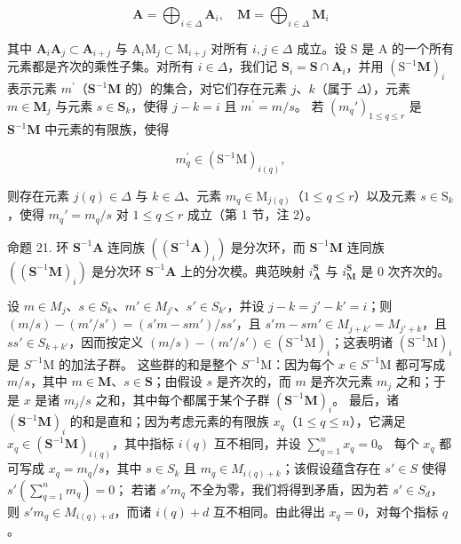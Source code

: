 \[
\mathbf {A} = \bigoplus_ {i \in \Delta} \mathbf {A} _ {i}, \quad \mathbf {M} = \bigoplus_ {i \in \Delta} \mathbf {M} _ {i}
\]

其中 \(\mathbf{A}_i\mathbf{A}_j\subset \mathbf{A}_{i + j}\) 与 \(\mathrm{A}_i\mathrm{M}_j\subset \mathrm{M}_{i + j}\) 对所有 \(i,j\in \Delta\) 成立。设 S 是 A 的一个所有元素都是齐次的乘性子集。对所有 \(i\in \Delta\)，我们记 \(\mathbf{S}_i = \mathbf{S}\cap \mathbf{A}_i\)，并用 \((\mathrm{S}^{-1}\mathbf{M})_i\) 表示元素 \(m^{\prime}\)（\(\mathbf{S}^{-1}\mathbf{M}\) 的）的集合，对它们存在元素 \(j\)、\(k\)（属于 \(\Delta\)），元素 \(m\in \mathbf{M}_j\) 与元素 \(s\in \mathbf{S}_k\)，使得 \(j - k = i\) 且 \(m^{\prime} = m / s\)。 若 \((m_q')_{1\leqslant q\leqslant r}\) 是 \(\mathbf{S}^{-1}\mathbf{M}\) 中元素的有限族，使得

\[
m _ {q} ^ {\prime} \in (\mathrm{S} ^ {- 1} \mathrm{M}) _ {i (q)},
\]

则存在元素 \(j(q) \in \Delta\) 与 \(k \in \Delta\)、元素 \(m_q \in \mathrm{M}_{j(q)}\)（\(1 \leqslant q \leqslant r\)）以及元素 \(s \in \mathrm{S}_k\)，使得 \(m_q' = m_q / s\) 对 \(1 \leqslant q \leqslant r\) 成立（第 1 节，注 2）。

命题 21. 环 \(\mathbf{S}^{-1}\mathbf{A}\) 连同族 \(((\mathbf{S}^{-1}\mathbf{A})_i)\) 是分次环，而 \(\mathbf{S}^{-1}\mathbf{M}\) 连同族 \(((\mathbf{S}^{-1}\mathbf{M})_i)\) 是分次环 \(\mathbf{S}^{-1}\mathbf{A}\) 上的分次模。典范映射 \(i_{\mathbf{A}}^{\mathbf{S}}\) 与 \(i_{\mathbf{M}}^{\mathbf{S}}\) 是 0 次齐次的。

设 \(m \in M_j\)、\(s \in S_k\)、\(m' \in M_{j'}\)、\(s' \in S_{k'}\)，并设 \(j - k = j' - k' = i\)；则 \((m/s) - (m'/s') = (s'm - sm')/ss'\)，且 \(s'm - sm' \in M_{j+k'} = M_{j'+k}\)，且 \(ss' \in S_{k+k'}\)，因而按定义 \((m/s) - (m'/s') \in (\mathrm{S}^{-1}\mathrm{M})_i\)；这表明诸 \((\mathrm{S}^{-1}\mathrm{M})_i\) 是 \(S^{-1}\mathrm{M}\) 的加法子群。 这些群的和是整个 \(S^{-1}\mathrm{M}\)：因为每个 \(x \in S^{-1}\mathrm{M}\) 都可写成 \(m/s\)，其中 \(m \in \mathbf{M}\)、\(s \in \mathbf{S}\)；由假设 \(s\) 是齐次的，而 \(m\) 是齐次元素 \(m_j\) 之和；于是 \(x\) 是诸 \(m_j / s\) 之和，其中每个都属于某个子群 \((\mathbf{S}^{-1}\mathbf{M})_i\)。 最后，诸 \((\mathbf{S}^{-1}\mathbf{M})_i\) 的和是直和；因为考虑元素的有限族 \(x_q\)（\(1 \leqslant q \leqslant n\)），它满足 \(x_q \in (\mathbf{S}^{-1}\mathbf{M})_{i(q)}\)，其中指标 \(i(q)\) 互不相同，并设 \(\sum_{q=1}^{n} x_q = 0\)。 每个 \(x_q\) 都可写成 \(x_q = m_q / s\)，其中 \(s \in S_k\) 且 \(m_q \in M_{i(q)+k}\)；该假设蕴含存在 \(s' \in S\) 使得 \(s'\left(\sum_{q=1}^{n} m_q\right) = 0\)； 若诸 \(s'm_q\) 不全为零，我们将得到矛盾，因为若 \(s' \in S_d\)，则 \(s'm_q \in M_{i(q)+d}\)，而诸 \(i(q) + d\) 互不相同。由此得出 \(x_q = 0\)，对每个指标 \(q\)。

